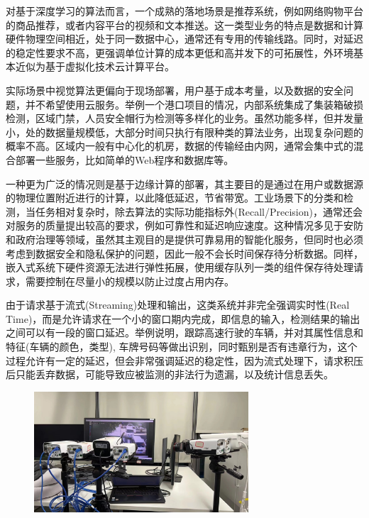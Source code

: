 \documentclass[master]{shtthesis}
\begin{document}
对基于深度学习的算法而言，一个成熟的落地场景是推荐系统，例如网络购物平台的商品推荐，或者内容平台的视频和文本推送。这一类型业务的特点是数据和计算硬件物理空间相近，处于同一数据中心，通常还有专用的传输线路。同时，对延迟的稳定性要求不高，更强调单位计算的成本更低和高并发下的可拓展性，外环境基本近似为基于虚拟化技术云计算平台。

实际场景中视觉算法更偏向于现场部署，用户基于成本考量，以及数据的安全问题，并不希望使用云服务。举例一个港口项目的情况，内部系统集成了集装箱破损检测，区域门禁，人员安全帽行为检测等多样化的业务。虽然功能多样，但并发量小，处的数据量规模低，大部分时间只执行有限种类的算法业务，出现复杂问题的概率不高。区域内一般有中心化的机房，数据的传输经由内网，通常会集中式的混合部署一些服务，比如简单的Web程序和数据库等。

一种更为广泛的情况则是基于边缘计算的部署，其主要目的是通过在用户或数据源的物理位置附近进行的计算，以此降低延迟，节省带宽。工业场景下的分类和检测，当任务相对复杂时，除去算法的实际功能指标外(Recall/Precision)，通常还会对服务的质量提出较高的要求，例如可靠性和延迟响应速度。这种情况多见于安防和政府治理等领域，虽然其主观目的是提供可靠易用的智能化服务，但同时也必须考虑到数据安全和隐私保护的问题，因此一般不会长时间保存待分析数据。同样，嵌入式系统下硬件资源无法进行弹性拓展，使用缓存队列一类的组件保存待处理请求，需要控制在尽量小的规模以防止过度占用内存。

由于请求基于流式(Streaming)\cite{muthukrishnan2005data}处理和输出，这类系统并非完全强调实时性(Real Time)\cite{jaffe1990software}，而是允许请求在一个小的窗口期内完成，即信息的输入，检测结果的输出之间可以有一段的窗口延迟。举例说明，跟踪高速行驶的车辆，并对其属性信息和特征(车辆的颜色，类型), 车牌号码等做出识别，同时甄别是否有违章行为，这个过程允许有一定的延迟，但会非常强调延迟的稳定性，因为流式处理下，请求积压后只能丢弃数据，可能导致应被监测的非法行为遗漏，以及统计信息丢失。

\begin{figure}[H]
	\centering
	\includegraphics[width=8cm]{img/hd.jpeg}
	\label{有线直连的超清摄像头}
\end{figure}
\end{document}
